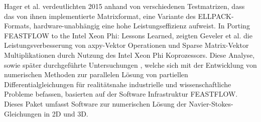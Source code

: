 Hager et al. \cite{doi:10.1137/130930352} verdeutlichten 2015 anhand von verschiedenen Testmatrizen, dass das von ihnen implementierte Matrixformat, eine Variante des ELLPACK-Formats, hardware-unabhängig eine hohe Leistungseffizienz aufweist. 
In \glqq Porting FEASTFLOW to the Intel Xeon Phi: Lessons Learned\grqq\cite{VenetisGoumasGevelerRibbrock2015}, zeigten Geveler et al. die Leistungsverbesserung von axpy-Vektor Operationen und Sparse Matrix-Vektor Multiplikationen durch Nutzung des Intel Xeon Phi Koprozessors. Diese Analyse, sowie später durchgeführte Untersuchungen \cite{GevelerRibbrock2015}, welche sich mit der Entwicklung von numerischen Methoden zur parallelen Lösung von partiellen Differentialgleichungen für realitätsnahe industrielle und wissenschaftliche Probleme befassen, basierten auf der Software Infrastruktur \glqq FEASTFLOW\grqq. Dieses Paket umfasst Software zur numerischen Lösung der Navier-Stokes-Gleichungen in 2D und 3D. 
